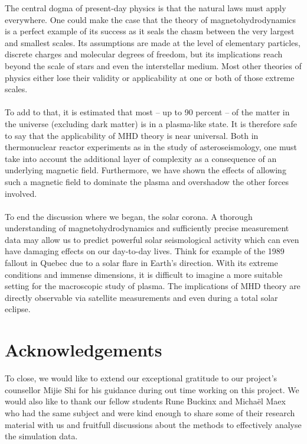 The central dogma of present-day physics is that the natural laws must apply everywhere. 
One could make the case that the theory of magnetohydrodynamics is a perfect example of its success as it seals the chasm between the very largest and smallest scales. 
Its assumptions are made at the level of elementary particles, discrete charges and molecular degrees of freedom, but its implications reach beyond the scale of stars and even the interstellar medium. 
Most other theories of physics either lose their validity or applicability at one or both of those extreme scales.\\
\\
To add to that, it is estimated that most – up to 90 percent \cite{notes-principles-MHD}– of the matter in the universe (excluding dark matter) is in a plasma-like state. 
It is therefore safe to say that the applicability of MHD theory is near universal. 
Both in thermonuclear reactor experiments as in the study of asteroseismology, one must take into account the additional layer of complexity as a consequence of an underlying magnetic field. 
Furthermore, we have shown the effects of allowing such a magnetic field to dominate the plasma and overshadow the other forces involved.\\ 
\\
To end the discussion where we began, the solar corona. 
A thorough understanding of magnetohydrodynamics and sufficiently precise measurement data may allow us to predict powerful solar seismological activity which can even have damaging effects on our day-to-day lives. 
Think for example of the 1989 fallout in Quebec due to a solar flare in Earth’s direction. 
With its extreme conditions and immense dimensions, it is difficult to imagine a more suitable setting for the macroscopic study of plasma. 
The implications of MHD theory are directly observable via satellite measurements and even during a total solar eclipse.
 
 

\section*{Acknowledgements}
To close, we would like to extend our exceptional gratitude to our project’s counsellor Mijie Shi for his guidance during out time working on this project. 
We would also like to thank our fellow students Rune Buckinx and Michaël Maex who had the same subject and were kind enough to share some of their research material with us and fruitfull discussions about the methods to effectively analyse the simulation data.
